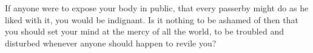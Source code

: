 If anyone were to  expose your body in public, that every  passerby might do as
he liked with it,  you would be indignant. Is it nothing to  be ashamed of then
that you should set your mind at the mercy of all the world, to be troubled and
disturbed whenever anyone should happen to revile you?
